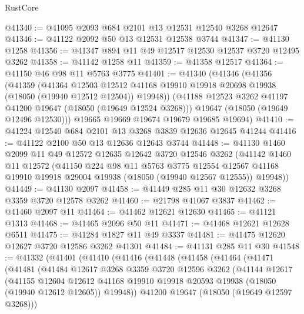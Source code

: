 \begin{lexlean}{RustCore}
\begin{coremodule}
@41340 := @41095 @2093 @684 @2101 @13 @12531 @12540 @3268 @12647
@41346 := @41122 @2092 @50 @13 @12531 @12538 @3744
@41347 := @41130 @1258
@41356 := @41347 @894 @11 @49 @12517 @12530 @12537 @3720 @12495 @3262
@41358 := @41142 @1258 @11
@41359 := @41358 @12517
@41364 := @41150 @46 @98 @11 @5763 @3775
@41401 := @41340
    (@41346
      (@41356
        (@41359
          (@41364
            @12503
            @12512
            @41168
            @19910
            @19918
            @20698
            @19938
            (@18050 (@19940 @12512 @12504))
            @19948))
        (@41188 @12523 @3262 @41197 @41200 @19647 (@18050 (@19649 @12524 @3268)))
        @19647
        (@18050 (@19649 @12496 @12530)))
      @19665
      @19669
      @19674
      @19679
      @19685
      @19694)
@41410 := @41224 @12540 @684 @2101 @13 @3268 @3839 @12636 @12645 @41244
@41416 := @41122 @2100 @50 @13 @12636 @12643 @3744
@41448 := @41130
    @1460
    @2099
    @11
    @49
    @12572
    @12635
    @12642
    @3720
    @12546
    @3262
    (@41142
      @1460
      @11
      @12572
      (@41150
        @224
        @98
        @11
        @5763
        @3775
        @12554
        @12567
        @41168
        @19910
        @19918
        @29004
        @19938
        (@18050 (@19940 @12567 @12555))
        @19948))
@41449 := @41130 @2097
@41458 := @41449 @285 @11 @30 @12632 @3268 @3359 @3720 @12578 @3262
@41460 := @21798 @41067 @3837
@41462 := @41460 @2097 @11
@41464 := @41462 @12621 @12630
@41465 := @41121 @1313
@41468 := @41465 @2096 @50 @11
@41471 := @41468 @12621 @12628 @6511
@41475 := @41284 @1827 @11 @49 @3337
@41481 := @41475 @12620 @12627 @3720 @12586 @3262 @41301
@41484 := @41131 @285 @11 @30
@41548 := @41332
    (@41401
      (@41410
        (@41416
          (@41448
            (@41458
              (@41464
                (@41471
                  (@41481
                    (@41484
                      @12617
                      @3268
                      @3359
                      @3720
                      @12596
                      @3262
                      (@41144
                        @12617
                        (@41155
                          @12604
                          @12612
                          @41168
                          @19910
                          @19918
                          @20593
                          @19938
                          (@18050 (@19940 @12612 @12605))
                          @19948))
                      @41200
                      @19647
                      (@18050 (@19649 @12597 @3268)))

\end{coremodule}
\end{lexlean}
